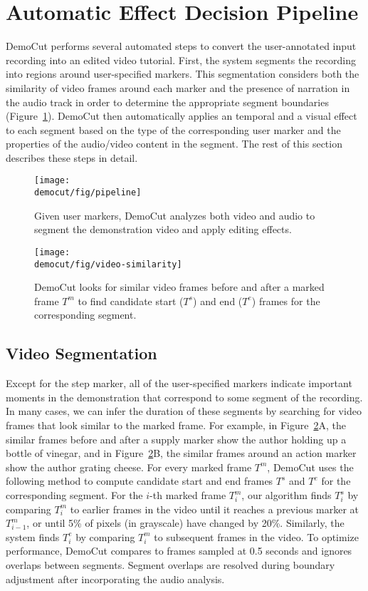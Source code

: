 \section{Automatic Effect Decision Pipeline}
DemoCut performs several automated steps to convert the user-annotated
input recording into an edited video tutorial. First, the system segments the recording into regions around user-specified markers. This segmentation considers both the
similarity of video frames around each marker and the presence of
narration in the audio track in order to determine the appropriate
segment boundaries (Figure~\ref{fig:democut_pipeline}). DemoCut then automatically applies an temporal and a visual effect to
each segment based on the type of the corresponding user marker and
the properties of the audio/video content in the segment. The rest of
this section describes these steps in detail.

\begin{figure}[b]
  \centering
\texttt{[image: \\democut/fig/pipeline]}
  \caption{Given user markers, DemoCut analyzes both video and audio to segment the demonstration video and apply editing effects.}
  \label{fig:democut_pipeline}
\end{figure}

\begin{figure}[t]
  \centering
\texttt{[image: \\democut/fig/video-similarity]}
  \caption{DemoCut looks for similar video frames before and
after a marked frame $T^m$ to find candidate start ($T^s$) and end ($T^e$) frames
for the corresponding segment.}
 \label{fig:video-similarity}
\end{figure}

\subsection{Video Segmentation}

Except for the step marker, all of the user-specified markers indicate
important moments in the demonstration that correspond to some segment
of the recording. In many cases, we can infer the duration of these
segments by searching for video frames that look similar to the marked
frame. For example, in Figure~\ref{fig:video-similarity}A, the similar
frames before and after a supply marker show the author holding up a
bottle of vinegar, and in Figure~\ref{fig:video-similarity}B, the
similar frames around an action marker show the author grating cheese.
%
For every marked frame $T^m$, DemoCut uses the following method to
compute candidate start and end frames $T^s$ and $T^e$ for the
corresponding segment.
%
For the $i$-th marked frame $T_i^m$, our algorithm finds $T_i^s$ by
comparing $T_i^m$ to earlier frames in the video until it reaches a
previous marker at $T_{i-1}^m$, or until 5\% of pixels (in grayscale)
have changed by 20\%. Similarly, the system
finds $T_i^e$ by comparing $T_i^m$ to subsequent frames in the video.
To optimize performance, DemoCut compares to frames sampled at 0.5
seconds and ignores overlaps between segments. Segment overlaps are
resolved during boundary adjustment after incorporating the audio
analysis.

